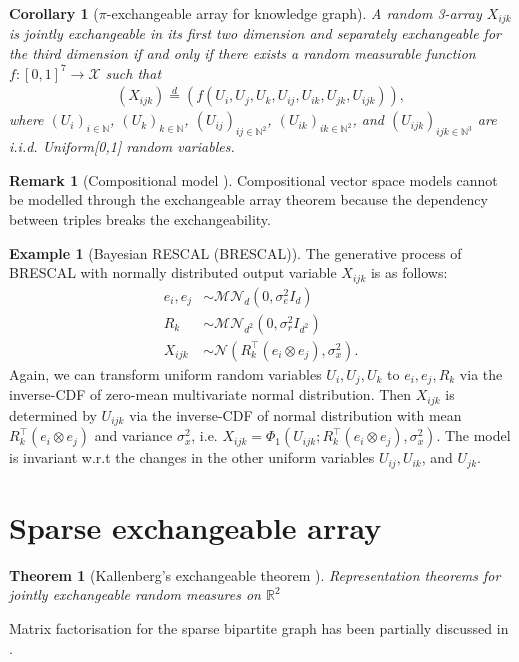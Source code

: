 \documentclass{article}
\newtheorem{theorem}{Theorem} %
\newtheorem{corollary}{Corollary}[theorem] %
\theoremstyle{definition}
\newtheorem{example}{Example}[definition]
\newtheorem{remark}{Remark}
\begin{document}
\begin{corollary}[$\pi$-exchangeable array for knowledge graph]
A random 3-array $X_{ijk}$ is jointly exchangeable in its first two dimension and separately exchangeable for the third dimension if and only if there exists a random measurable function $f:[0,1]^7 \rightarrow \mathcal{X}$ such that
\begin{align}
(X_{ijk})  \stackrel{d}{=} (f(U_i, U_j, U_k, U_{ij}, U_{ik}, U_{jk}, U_{ijk})),
\end{align}
where $(U_i)_{i\in \mathbb{N}}$, $(U_k)_{k\in \mathbb{N}}$, $(U_{ij})_{ij\in \mathbb{N}^2}$, $(U_{ik})_{ik\in \mathbb{N}^2}$, and $(U_{ijk})_{ijk\in \mathbb{N}^3}$  are i.i.d. Uniform[0,1] random variables.
\end{corollary}

\begin{remark}[Compositional model \cite{gu2015traversing}] Compositional vector space models cannot be modelled through the exchangeable array theorem because the dependency between triples breaks the exchangeability.
\end{remark}

\begin{example}[Bayesian RESCAL (BRESCAL)] The generative process of BRESCAL with normally distributed output variable $X_{ijk}$ is as follows:
\begin{align}
e_i, e_j &\sim \mathcal{MN}_d(0, \sigma_e^2 I_d)\\
R_k &\sim \mathcal{MN}_{d^2}(0, \sigma_r^2 I_{d^2})\\
X_{ijk} &\sim \mathcal{N}(R_k^\top (e_i \otimes e_j), \sigma_x^2).
\end{align}
Again, we can transform uniform random variables $U_i, U_j, U_k$ to $e_i, e_j, R_k$ via the inverse-CDF of zero-mean multivariate normal distribution. Then $X_{ijk}$ is determined by $U_{ijk}$ via the inverse-CDF of normal distribution with mean $R_k^\top (e_i \otimes e_j)$ and variance $\sigma_x^2$, i.e. $X_{ijk} = \Phi_1(U_{ijk};R_k^\top (e_i \otimes e_j), \sigma_x^2)$. The model is invariant w.r.t the changes in the other uniform variables $U_{ij}, U_{ik}$, and $U_{jk}$.
\end{example}

\section{Sparse exchangeable array}
\begin{theorem}[Kallenberg's exchangeable theorem \cite{Kallenberg1990}] Representation theorems for jointly exchangeable random measures on $\mathbb{R}^2$
\end{theorem}

Matrix factorisation for the sparse bipartite graph has been partially discussed in \cite{Caron2012}.



\end{document}
